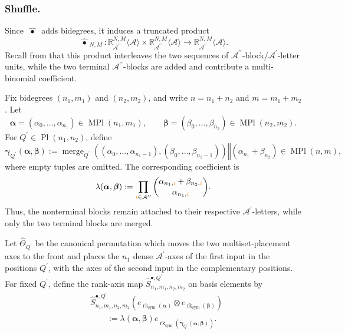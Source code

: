 \documentclass{amsart}
\theoremstyle{definition}
\theoremstyle{remark}
\newcommand{\gammashuffle}{{\,\bullet\,}}
\newcommand{\gammashufflesym}{{\,\widehat{\gammashuffle}\,}}
\newcommand{\orange}[1]{{\color{orange}#1}}
\begin{document}
\subsubsection{Shuffle.}
\label{sec:symmetrized_shear_shuffle}

Since $\gammashufflesym$ adds bidegrees, it induces a truncated product
\[
    \gammashufflesym_{N,M}
    :
    \mathbb{R}_{\mathcal{A}^{\prime\prime}}^{N,M}
    \langle\mathcal{A}\rangle
    \times
    \mathbb{R}_{\mathcal{A}^{\prime\prime}}^{N,M}
    \langle\mathcal{A}\rangle
    \longrightarrow
    \mathbb{R}_{\mathcal{A}^{\prime\prime}}^{N,M}
    \langle\mathcal{A}\rangle.
\]
Recall from \cite[Theorem~3.10]{mainpaper} that this product interleaves the
two sequences of
$\mathcal{A}^{\prime\prime}$-block/$\mathcal{A}^{\prime}$-letter units,
while the two terminal
$\mathcal{A}^{\prime\prime}$-blocks are added and contribute a
multi-binomial coefficient.

Fix bidegrees $(n_1,m_1)$ and $(n_2,m_2)$, and write
$n=n_1+n_2$ and $m=m_1+m_2$. Let
\[
    \boldsymbol{\alpha}
    =
    (\alpha_0,\ldots,\alpha_{n_1})
    \in
    \operatorname{MPl}(n_1,m_1),
    \qquad
    \boldsymbol{\beta}
    =
    (\beta_0,\ldots,\beta_{n_2})
    \in
    \operatorname{MPl}(n_2,m_2).
\]
For
$Q^{\prime}\in\operatorname{Pl}(n_1,n_2)$, define
\[
    \boldsymbol{\gamma}_{Q^{\prime}}
    (\boldsymbol{\alpha},\boldsymbol{\beta})
    :=
    \operatorname{merge}_{Q^{\prime}}
    \left(
        (\alpha_0,\ldots,\alpha_{n_1-1}),
        (\beta_0,\ldots,\beta_{n_2-1})
    \right)
    \mathbin{\Vert}
    \left(
        \alpha_{n_1}+\beta_{n_2}
    \right)
    \in
    \operatorname{MPl}(n,m),
\]
where empty tuples are omitted. The corresponding coefficient is
\[
    \lambda
    (\boldsymbol{\alpha},\boldsymbol{\beta})
    :=
    \prod_{\orange{i}\in\mathcal{A}^{\prime\prime}}
    \binom{
        \alpha_{n_1,\orange{i}}
        +
        \beta_{n_2,\orange{i}}
    }{
        \alpha_{n_1,\orange{i}}
    }.
\]
Thus, the nonterminal blocks remain attached to their respective
$\mathcal{A}^{\prime}$-letters, while only the two terminal blocks are
merged.

Let $\widehat{\Theta}_{Q^{\prime}}$ be the canonical permutation which
moves the two multiset-placement axes to the front and places the
$n_1$ dense $\mathcal{A}^{\prime}$-axes of the first input in the
positions $Q^{\prime}$, with the axes of the second input in the
complementary positions. For fixed $Q^{\prime}$, define the rank-axis map
$\widehat{S}^{\bullet,Q^{\prime}}_{n_1,m_1,n_2,m_2}$ on basis elements by
\[
\begin{aligned}
    &
    \widehat{S}^{\bullet,Q^{\prime}}_{n_1,m_1,n_2,m_2}
    \left(
        e_{\operatorname{rk}_{\mathrm{sym}}(\boldsymbol{\alpha})}
        \otimes
        e_{\operatorname{rk}_{\mathrm{sym}}(\boldsymbol{\beta})}
    \right)
    \\
    &\qquad
    :=
    \lambda
    (\boldsymbol{\alpha},\boldsymbol{\beta})
    e_{\operatorname{rk}_{\mathrm{sym}}
        \left(
            \boldsymbol{\gamma}_{Q^{\prime}}
            (\boldsymbol{\alpha},\boldsymbol{\beta})
        \right)}.
\end{aligned}
\]
\end{document}
